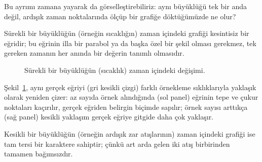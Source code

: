 Bu ayrımı zamana yayarak da görselleştirebiliriz: aynı büyüklüğü tek bir anda değil, ardışık
zaman noktalarında ölçüp bir grafiğe döktüğümüzde ne olur?

Sürekli bir büyüklüğün (örneğin sıcaklığın) zaman içindeki grafiği kesintisiz bir eğridir;
bu eğrinin illa bir parabol ya da başka özel bir şekil olması gerekmez, tek gereken zamanın
her anında bir değerin tanımlı olmasıdır.

\begin{figure}[H]
\centering
{}
\caption{Sürekli bir büyüklüğün (sıcaklık) zaman içindeki değişimi.}
\label{fig:termometre-zaman}
\end{figure}

Şekil~\ref{fig:termometre-zaman}, aynı gerçek eğriyi (gri kesikli çizgi) farklı örnekleme
sıklıklarıyla yaklaşık olarak yeniden çizer: az sayıda örnek alındığında (sol panel) eğrinin
tepe ve çukur noktaları kaçırılır, gerçek eğriden belirgin biçimde sapılır; örnek sayısı
arttıkça (sağ panel) kesikli yaklaşım gerçek eğriye gitgide daha çok yaklaşır.

Kesikli bir büyüklüğün (örneğin ardışık zar atışlarının) zaman içindeki grafiği ise tam
tersi bir karaktere sahiptir; çünkü art arda gelen iki atış birbirinden tamamen bağımsızdır.

